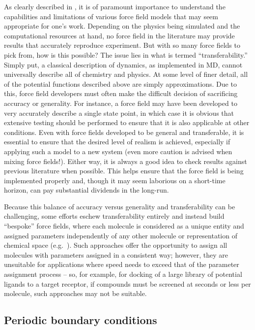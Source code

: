 \documentclass[9pt,bestpractices]{livecoms}
\begin{document}
As clearly described in \citet{Becker2013}, it is of paramount importance to understand the capabilities and limitations of various force field models that may seem appropriate for one's work. 
Depending on the physics being simulated and the computational resources at hand, no force field in the literature may provide results that accurately reproduce experiment.
But with so many force fields to pick from, how is this possible?
The issue lies in what is termed ``transferability.'' 
Simply put, a classical description of dynamics, as implemented in MD, cannot universally describe all of chemistry and physics. 
At some level of finer detail, all of the potential functions described above are simply approximations.
Due to this, force field developers must often make the difficult decision of sacrificing accuracy or generality. 
For instance, a force field may have been developed to very accurately describe a single state point, in which case it is obvious that extensive testing should be performed to ensure that it is also applicable at other conditions.
Even with force fields developed to be general and transferable, it is essential to ensure that the desired level of realism is achieved, especially if applying such a model to a new system (even more caution is advised when mixing force fields!).
Either way, it is always a good idea to check results against previous literature when possible.
This helps ensure that the force field is being implemented properly and, though it may seem laborious on a short-time horizon, can pay substantial dividends in the long-run.

Because this balance of accuracy versus generality and transferability can be challenging, some efforts eschew transferability entirely and instead build ``bespoke'' force fields, where each molecule is considered as a unique entity and assigned parameters independently of any other molecule or representation of chemical space (e.g.~\cite{Dupradeau:2010:PhysChemChemPhys}).
Such approaches offer the opportunity to assign all molecules with parameters assigned in a consistent way; however, they are unsuitable for applications where speed needs to exceed that of the parameter assignment process -- so, for example, for docking of a large library of potential ligands to a target receptor, if compounds must be screened at seconds or less per molecule, such approaches may not be suitable.


\subsection{Periodic boundary conditions}
\label{sec:periodic}
\end{document}
